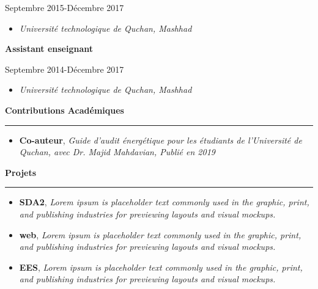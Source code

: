 \documentclass[a4paper]{letter}
\newcommand{\divider}{\rule{\linewidth}{0.9pt}}
\begin{document}
\begin{minipage}[t]{0.60\textwidth}
{\footnotesize Septembre 2015-Décembre 2017}
\begin{itemize}
   \footnotesize \item \textit{Université technologique de Quchan, Mashhad}
\end{itemize}

\vspace{3mm}

{ \textbf{Assistant enseignant}}

{ \footnotesize Septembre 2014-Décembre 2017}
\begin{itemize}
    \footnotesize \item \textit{Université technologique de Quchan, Mashhad}
\end{itemize}





\vspace{0.8cm}


{\large \textbf{Contributions Académiques}}
\divider
\vspace{4mm}
\begin{itemize}
    \footnotesize \item {\textbf{Co-auteur}, \textit{Guide d’audit énergétique pour les étudiants de l’Université de Quchan, avec Dr. Majid Mahdavian, Publié en 2019}}


\end{itemize}

\vspace{3mm}



{\large \textbf{Projets}}
\divider
\vspace{4mm}
\begin{itemize}
    \footnotesize \item {\textbf{SDA2}, \textit{Lorem ipsum is placeholder text commonly used in the graphic, print, and publishing industries for previewing layouts and visual mockups.}}
    \footnotesize \item {\textbf{web}, \textit{Lorem ipsum is placeholder text commonly used in the graphic, print, and publishing industries for previewing layouts and visual mockups.}}
    \footnotesize \item {\textbf{EES}, \textit{Lorem ipsum is placeholder text commonly used in the graphic, print, and publishing industries for previewing layouts and visual mockups.}}



\end{itemize}
\end{minipage}
\end{document}
